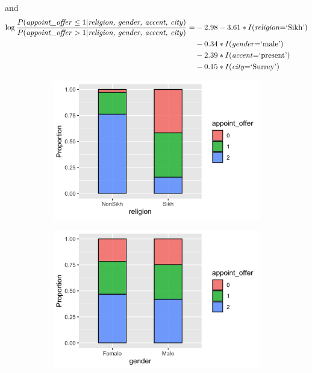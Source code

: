 \documentclass[11pt]{article}
\begin{document}
and 
\begin{equation}
    \begin{split}
        \log \frac{P(\textnormal{\textit{appoint\_offer}} \leq 1|\textnormal{\textit{religion, gender, accent, city}})}{P(\textnormal{\textit{appoint\_offer}} > 1|\textnormal{\textit{religion, gender, accent, city}})}  = & -2.98 - 3.61*I\textnormal{(\textit{religion}=`Sikh')} \\ & -0.34 *I\textnormal{(\textit{gender}=`male')}   \\
        & -2.39*I\textnormal{(\textit{accent}=`present')}  \\ &  -0.15*I\textnormal{(\textit{city}=`Surrey')} 
    \end{split}
\end{equation}


\begin{figure}[!t]
    \centering
    \begin{subfigure}{0.45\textwidth}
        \centering
        \includegraphics[width=\textwidth]{../../Plots/Proportions_appoint_offer_religion.png}
        \caption{}
    \end{subfigure}
    \begin{subfigure}{0.45\textwidth}
        \centering
        \includegraphics[width=\textwidth]{../../Plots/Proportions_appoint_offer_gender.png}

\end{subfigure}
\end{figure}
\end{document}
